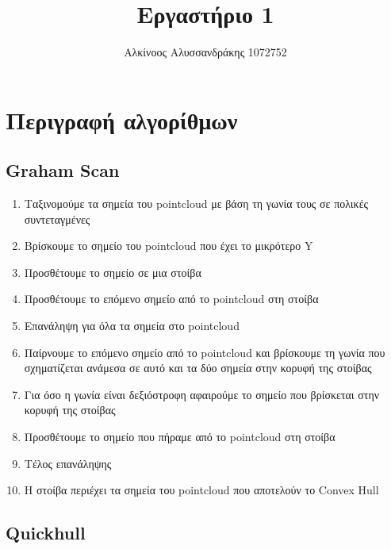 \documentclass{article}
\title{Εργαστήριο 1}
\author{Αλκίνοος Αλυσσανδράκης 1072752}
\date{}
\begin{document}
\maketitle

\section{Περιγραφή αλγορίθμων}

\subsection{Graham Scan}

\begin{enumerate}
	\item Ταξινομούμε τα σημεία του pointcloud με βάση τη γωνία τους σε πολικές
		συντεταγμένες
	\item Βρίσκουμε το σημείο του pointcloud που έχει το μικρότερο Y
	\item Προσθέτουμε το σημείο σε μια στοίβα
	\item Προσθέτουμε το επόμενο σημείο από το pointcloud στη στοίβα
	\item Επανάληψη για όλα τα σημεία στο pointcloud
	\item Παίρνουμε το επόμενο σημείο από το pointcloud και βρίσκουμε τη γωνία που σχηματίζεται ανάμεσα σε αυτό και τα δύο σημεία στην κορυφή της στοίβας
	\item Για όσο η γωνία είναι δεξιόστροφη αφαιρούμε το σημείο που βρίσκεται στην κορυφή της στοίβας
	\item Προσθέτουμε το σημείο που πήραμε από το pointcloud στη στοίβα
	\item Τέλος επανάληψης
	\item Η στοίβα περιέχει τα σημεία του pointcloud που αποτελούν το Convex Hull
\end{enumerate}

\subsection{Quickhull}
\end{document}
